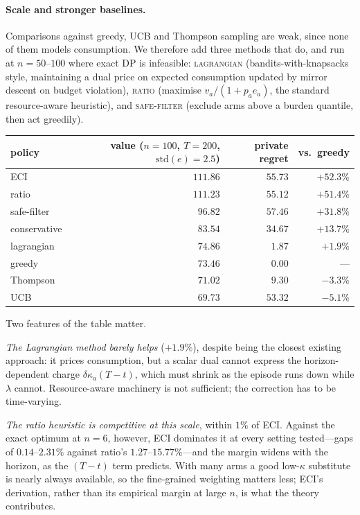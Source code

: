\paragraph{Scale and stronger baselines.} Comparisons against greedy, UCB and
Thompson sampling are weak, since none of them models consumption. We therefore add
three methods that do, and run at $n=50$--$100$ where exact DP is infeasible:
\textsc{lagrangian} (bandits-with-knapsacks style, maintaining a dual price on
expected consumption updated by mirror descent on budget violation),
\textsc{ratio} (maximise $v_a/(1+p_ae_a)$, the standard resource-aware heuristic),
and \textsc{safe-filter} (exclude arms above a burden quantile, then act greedily).

\begin{center}
\begin{tabular}{lrrr}
\toprule
policy & value ($n{=}100$, $T{=}200$, $\mathrm{std}(e){=}2.5$) & private regret & vs.\ greedy \\
\midrule
ECI & $\mathbf{111.86}$ & $55.73$ & $+52.3\%$ \\
ratio & $111.23$ & $55.12$ & $+51.4\%$ \\
safe-filter & $96.82$ & $57.46$ & $+31.8\%$ \\
conservative & $83.54$ & $34.67$ & $+13.7\%$ \\
lagrangian & $74.86$ & $1.87$ & $+1.9\%$ \\
greedy & $73.46$ & $\mathbf{0.00}$ & --- \\
Thompson & $71.02$ & $9.30$ & $-3.3\%$ \\
UCB & $69.73$ & $53.32$ & $-5.1\%$ \\
\bottomrule
\end{tabular}
\end{center}

Two features of the table matter.

\emph{The Lagrangian method barely helps} ($+1.9\%$), despite being the closest
existing approach: it prices consumption, but a scalar dual cannot express the
horizon-dependent charge $\delta\kappa_a(T-t)$, which must shrink as the episode
runs down while $\lambda$ cannot. Resource-aware machinery is not sufficient; the
correction has to be time-varying.

\emph{The ratio heuristic is competitive at this scale}, within $1\%$ of ECI.
Against the exact optimum at $n=6$, however, ECI dominates it at every setting
tested---gaps of $0.14$--$2.31\%$ against ratio's $1.27$--$15.77\%$---and the margin
widens with the horizon, as the $(T-t)$ term predicts. With many arms a good
low-$\kappa$ substitute is nearly always available, so the fine-grained weighting
matters less; ECI's derivation, rather than its empirical margin at large $n$, is
what the theory contributes.

